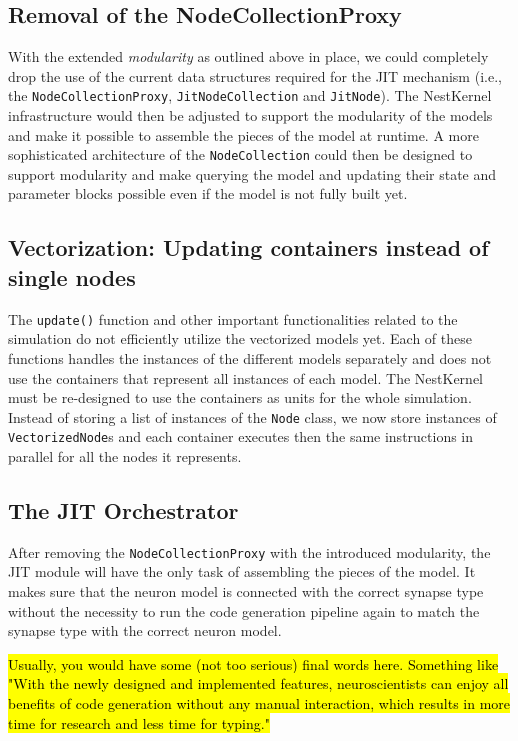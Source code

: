 \subsection*{Removal of the NodeCollectionProxy}

With the extended \emph{modularity} as outlined above in place, we could completely drop the use of the current data structures required for the JIT mechanism (i.e., the \texttt{NodeCollectionProxy}, \texttt{JitNodeCollection} and \texttt{JitNode}). The NestKernel infrastructure would then be adjusted to support the modularity of the models and make it possible to assemble the pieces of the model at runtime. A more sophisticated architecture of the \texttt{NodeCollection} could then be designed to support modularity and make querying the model and updating their state and parameter blocks possible even if the model is not fully built yet.

\subsection*{Vectorization: Updating containers instead of single nodes}

The \texttt{update()} function and other important functionalities related to the simulation do not efficiently utilize the vectorized models yet. Each of these functions handles the instances of the different models separately and does not use the containers that represent all instances of each model. The NestKernel must be re-designed to use the containers as units for the whole simulation. Instead of storing a list of instances of the \texttt{Node} class, we now store instances of \texttt{VectorizedNode}s and each container executes then the same instructions in parallel for all the nodes it represents.

\subsection*{The JIT Orchestrator}

After removing the \texttt{NodeCollectionProxy} with the introduced modularity, the JIT module will have the only task of assembling the pieces of the model. It makes sure that the neuron model is connected with the correct synapse type without the necessity to run the code generation pipeline again to match the synapse type with the correct neuron model.


\hl{Usually, you would have some (not too serious) final words here. Something like "With the newly designed and implemented features, neuroscientists can enjoy all benefits of code generation without any manual interaction, which results in more time for research and less time for typing."}

\cleardoublepage
